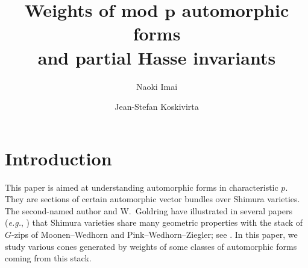 \documentclass[11pt]{amsart}
\title{Weights of mod $\boldsymbol{p}$ automorphic forms\\ and partial Hasse invariants}
\author{Naoki Imai}
\author{Jean-Stefan Koskivirta}
\numberwithin{equation}{section}
\theoremstyle{definition}
\theoremstyle{remark}
\begin{document}


\maketitle


\begin{prelims}

\DisplayAbstractInEnglish

\bigskip

\DisplayKeyWords

\medskip

\DisplayMSCclass

\end{prelims}



\newpage

\setcounter{tocdepth}{1}

\tableofcontents




    
\section{Introduction}

This paper is aimed at understanding automorphic forms in characteristic $p$. They are sections of certain automorphic vector bundles over Shimura varieties. The second-named author and W.~Goldring have illustrated in several papers (\textit{e.g.}, \cite{Goldring-Koskivirta-Strata-Hasse,Goldring-Koskivirta-global-sections-compositio}) that Shimura varieties share many geometric properties with the stack of $G$-zips of Moonen--Wedhorn and Pink--Wedhorn--Ziegler; see \cite{Moonen-Wedhorn-Discrete-Invariants, Pink-Wedhorn-Ziegler-zip-data}. In this paper, we study various cones generated by weights of some classes of automorphic forms coming from this stack.
\end{document}
